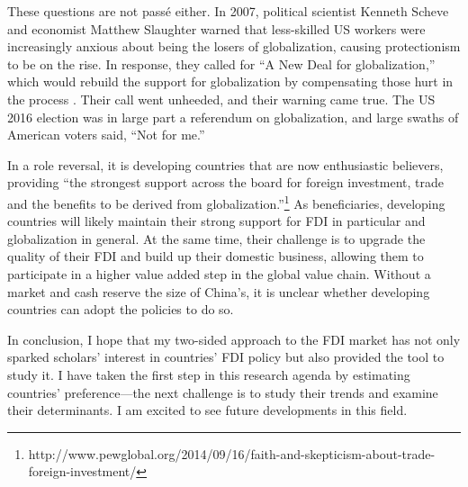 These questions are not pass\'e either. In 2007, political scientist Kenneth
Scheve and economist Matthew Slaughter warned that less-skilled US workers were
increasingly anxious about being the losers of globalization, causing
protectionism to be on the rise. In response, they called for ``A New Deal for
globalization,'' which would rebuild the support for globalization by
compensating those hurt in the process \citep{Scheve2007}. Their call went
unheeded, and their warning came true. The US 2016 election was in large part a
referendum on globalization, and large swaths of American voters said, ``Not for
me.''

In a role reversal, it is developing countries that are now enthusiastic
believers, providing ``the strongest support across the board for foreign
investment, trade and the benefits to be derived from
globalization.''\footnote{http://www.pewglobal.org/2014/09/16/faith-and-skepticism-about-trade-foreign-investment/}
As beneficiaries, developing countries will likely maintain their strong support
for FDI in particular and globalization in general. At the same time, their
challenge is to upgrade the quality of their FDI and build up their domestic
business, allowing them to participate in a higher value added step in the
global value chain. Without a market and cash reserve the size of China's, it is
unclear whether developing countries can adopt the policies to do so.

In conclusion, I hope that my two-sided approach to the FDI market has not only
sparked scholars' interest in countries' FDI policy but also provided the tool
to study it. I have taken the first step in this research agenda by estimating
countries' preference---the next challenge is to study their trends and examine
their determinants. I am excited to see future developments in this field.

